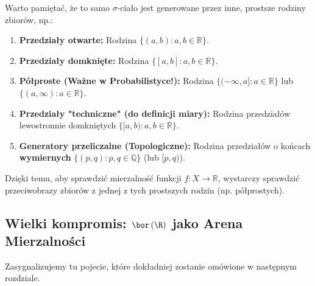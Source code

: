 \begin{remark}
    Warto pamiętać, że to samo $\sigma$-ciało jest generowane przez inne, prostsze rodziny zbiorów, np.:
    \begin{enumerate}
        \item \textbf{Przedziały otwarte:} Rodzina $\{(a,b) : a,b \in \mathbb{R}\}$.
        \item \textbf{Przedziały domknięte:} Rodzina $\{[a,b] : a,b \in \mathbb{R}\}$.
        \item \textbf{Półproste (Ważne w Probabilistyce!):} 
        Rodzina $\{(-\infty, a] : a \in \mathbb{R}\}$ lub $\{(a, \infty) : a \in \mathbb{R}\}$.
        \item \textbf{Przedziały "techniczne" (do definicji miary):} 
        Rodzina przedziałów lewostronnie domkniętych $\{[a, b) : a,b \in \mathbb{R}\}$.
        \item \textbf{Generatory przeliczalne (Topologiczne):}
        Rodzina przedziałów o końcach \textbf{wymiernych} $\{(p, q) : p,q \in \mathbb{Q}\}$ (lub $[p, q)$).
    \end{enumerate} 
    Dzięki temu, aby sprawdzić mierzalność funkcji $f: X \to \mathbb{R}$, wystarczy sprawdzić przeciwobrazy zbiorów z jednej z tych prostszych rodzin (np. półprostych).
\end{remark}

\subsection{Wielki kompromis: $\bor\left(\R\right) $ jako Arena Mierzalności}
Zasygnalizujemy tu pojecie, które dokładniej zostanie omówione w następnym rozdziale.

